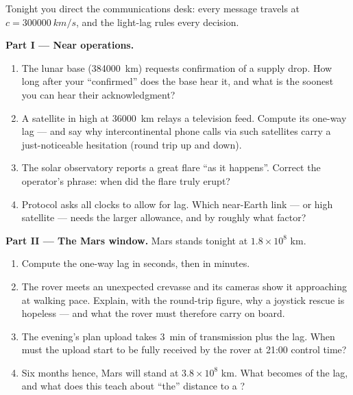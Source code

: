 \begin{problem}\label{pb:g8:speed-of-light:1}
Tonight you direct the communications desk: every message
travels at $c = \qty{300000}{km/s}$, and the light-lag rules
every decision.

\medskip\noindent\textbf{Part I --- Near operations.}
\begin{enumerate}
  \item The lunar base (\qty{384000}{km}) requests
        confirmation of a supply drop. How long after your
        ``confirmed'' does the base hear it, and what is the
        soonest you can hear their acknowledgment?
  \item A satellite in high  at \qty{36000}{km} relays
        a television feed. Compute its one-way lag ---
        and say why intercontinental phone calls via such
        satellites carry a just-noticeable hesitation
        (round trip up and down).
  \item The solar observatory reports a great flare ``as it
        happens''. Correct the operator's phrase: when did
        the flare truly erupt?
  \item Protocol asks all clocks to allow for lag. Which
        near-Earth link ---  or high satellite --- needs
        the larger allowance, and by roughly what factor?
\end{enumerate}

\medskip\noindent\textbf{Part II --- The Mars window.}
Mars stands tonight at $1.8 \times 10^{8}$ km.
\begin{enumerate}[resume]
  \item Compute the one-way lag in seconds, then in minutes.
  \item The rover meets an unexpected crevasse and its
        cameras show it approaching at walking pace. Explain,
        with the round-trip figure, why a joystick rescue is
        hopeless --- and what the rover must therefore carry
        on board.
  \item The evening's plan upload takes \qty{3}{min} of
        transmission plus the lag. When must the upload
        start to be fully received by the rover at 21:00
        control time?
  \item Six months hence, Mars will stand at $3.8 \times
        10^{8}$ km. What becomes of the lag, and what does
        this teach about ``the'' distance to a ?
\end{enumerate}


\end{problem}
